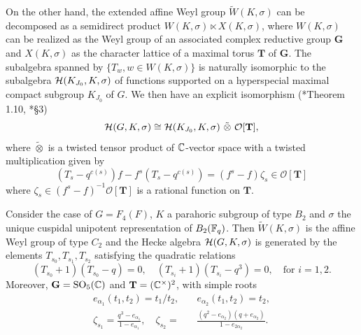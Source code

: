 On the other hand, the extended affine Weyl group $\tilde{W}(K,\sigma)$ can be decomposed as a semidirect product $W(K,\sigma)\ltimes X(K,\sigma)$, where $W(K,\sigma)$ can be realized as the Weyl group of an associated complex reductive group $\mathbf{G}$ and $X(K,\sigma)$ as the character lattice of a maximal torus $\mathbf{T}$ of $\mathbf{G}$. The subalgebra spanned by $\{T_w, w\in W(K,\sigma)\}$ is naturally isomorphic to the subalgebra $\mathcal{H}(K_{J_0},K,\sigma)$ of functions supported on a hyperspecial maximal compact subgroup $K_{J_0}$ of $G$. We then have an explicit isomorphism (\cite{Solleveld2021}*{Theorem 1.10}, \cite{Lusztig1989}*{\S3})
\begin{equation}
    \cH(G,K,\sigma)\cong\cH(K_{J_0},K,\sigma)\ \tilde\otimes\ \mathcal{O}[\mathbf{T}],
\end{equation}
where $\tilde\otimes$ is a twisted tensor product of $\mathbb{C}$-vector space with a twisted multiplication given by 
$$(T_s-q^{c(s)})f-f^{s}(T_s-q^{c(s)})=(f^s-f)\zeta_s\in\mathcal{O}[\mathbf{T}]$$
where $\zeta_s\in(f^s-f)^{-1}\mathcal{O}[\mathbf{T}]$ is a rational function on $\mathbf{T}$. 
\begin{example}\label{ex:F4_B2_algebra}
    Consider the case of $G=F_4(F)$, $K$ a parahoric subgroup of type $B_2$ and $\sigma$ the unique cuspidal unipotent representation of $B_2(\mathbb{F}_q)$. Then $\tilde{W}(K,\sigma)$ is the affine Weyl group of type $C_2$ and the Hecke algebra $\mathcal{H}(G,K,\sigma)$ is generated by the elements $T_{s_0}, T_{s_1}, T_{s_2}$ satisfying the quadratic relations
    $$(T_{s_0}+1)(T_{s_0}-q)=0,\quad (T_{s_i}+1)(T_{s_i}-q^{3})=0,\quad\text{for }i=1,2.$$
    Moreover, $\mathbf{G}=\mathrm{SO}_5(\mathbb{C})$ and $\mathbf{T}=(\mathbb{C}^\times)^2$, with simple roots 
    \begin{align*}
        e_{\alpha_1}(t_1,t_2)=t_1/t_2,\quad &e_{\alpha_2}(t_1,t_2)=t_2,\\
        \zeta_{s_1}=\frac{q^3-e_{\alpha_1}}{1-e_{\alpha_1}},\quad \zeta_{s_2}=&\frac{(q^2-e_{\alpha_2})(q+e_{\alpha_2})}{1-e_{2\alpha_2}}.
    \end{align*}
\end{example}

